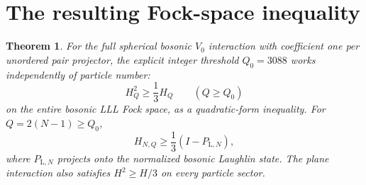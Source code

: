 \documentclass[11pt]{article}
\newtheorem{theorem}{Theorem}
\begin{document}
\section{The resulting Fock-space inequality}
\begin{theorem}\label{thm:gap}
For the full spherical bosonic $V_0$ interaction with coefficient one per
unordered pair projector, the explicit integer threshold $Q_0=3088$
works independently of particle number:
\begin{equation}\label{eq:gap}
 H_Q^2\ge\frac13H_Q\qquad(Q\ge Q_0)
\end{equation}
on the entire bosonic LLL Fock space, as a quadratic-form inequality.
For $Q=2(N-1)\ge Q_0$,
\begin{equation}
 H_{N,Q}\ge\frac13(I-P_{\mathrm L,N}),
\end{equation}
where $P_{\mathrm L,N}$ projects onto the normalized bosonic Laughlin state.
The plane interaction also satisfies $H^2\ge H/3$ on every particle sector.
\end{theorem}
\end{document}
